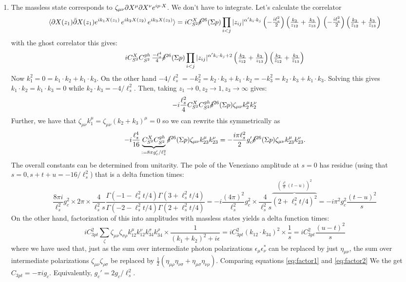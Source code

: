 \documentclass[11pt, class=article, crop=false]{standalone}
\begin{document}
\begin{enumerate}
	
	\item The massless state corresponds to $\zeta_{\mu \nu} \partial X^\mu \partial X^\nu e^{i p \cdot X}$. We don't have to integrate. Let's calculate the correlator
	\[
		\braket{\partial X(z_1) \bar {\partial} X(z_1) e^{i k_1 X(z_1)}\,  e^{i k_2 X(z_2)} \,  e^{i k_3 X(z_3)} } 
		= i C_{S^2}^X \cancel\delta^{26}(\Sigma p) \prod_{i<j} |z_{ij}|^{\alpha' k_i \cdot k_j} \left(-\tfrac{i \ell_s^2}{2}\right) \left(\tfrac{k_2}{z_{12}} + \tfrac{k_3}{z_{13}}\right) \, \left(-\tfrac{i\ell_s^2}{2}\right) \left(\tfrac{k_2}{\bar z_{12}} + \tfrac{k_3}{\bar z_{13}}\right)
	\]
	with the ghost correlator this gives:
	\[
		i C_{S^2}^X C_{S^2}^{gh} \, \tfrac{-\ell_s^4}{4} \cancel\delta^{26}(\Sigma p) \prod_{i<j} |z_{ij}|^{\alpha' k_i \cdot k_j + 2} \left(\tfrac{k_2}{z_{12}} + \tfrac{k_3}{z_{13}}\right)  \left(\tfrac{k_2}{\bar z_{12}} + \tfrac{k_3}{\bar z_{13}}\right)
	\]
	Now $k_1^2 = 0 = k_1 \cdot k_2 + k_1 \cdot k_3$. On the other hand $-4/\ell_s^2 = -k_2^2 = k_2 \cdot k_3 + k_1 \cdot k_2 = -k_3^2 = k_2 \cdot k_3 + k_1 \cdot k_3$. Solving this gives $k_1 \cdot k_2 = k_1 \cdot k_3 = 0$ while $k_2 \cdot k_3 = -4/\ell_s^2$. Then, taking $z_1 \to 0, z_2 \to 1, z_3 \to \infty$ gives:
	\[
		-i \frac{\ell_s^2}{4} C_{S^2}^X C_{S^2}^{gh} \cancel\delta^{26}(\Sigma p) \zeta_{\mu \nu}k_2^\mu k_2^\nu
	\] 
	Further, we have that $\zeta_{\mu \nu} k_1^\mu = \zeta_{\mu \nu} (k_2 + k_3)^\mu = 0$ so we can rewrite this symmetrically as 
	\[
		-i \frac{\ell_s^4}{16} \underbrace{C_{S^2}^X C_{S^2}^{gh}}_{:= 8 \pi g_c'/\ell_s^2} \cancel\delta^{26}(\Sigma p) \zeta_{\mu \nu}  k_{23}^\mu k_{23}^\nu = -\frac{i \pi \ell_s^2}{2} g_c' \cancel\delta^{26}(\Sigma p) \zeta_{\mu \nu} k_{23}^\mu k_{23}^\nu.
	\]
	The overall constants can be determined from unitarity. The pole of the Veneziano amplitude at $s = 0$ has residue (using that $s = 0, s+t+u = -16/\ell_s^2$) that is a delta function times:
	\begin{equation}\label{eq:factor1}
		\frac{8 \pi i}{\ell_s^2} g_c^2 \times 2\pi \times \frac{4}{\ell_s^2 s} \frac{\Gamma(-1-\ell_s^2 t/4) \Gamma(3 + \ell_s^2 t/4)}{\Gamma(-2-\ell_s^2 t/4) \Gamma(2 + \ell_s^2 t/4)} = -i \frac{(4 \pi)^2}{\ell_s^2} g_c^2 \times \frac{4}{\ell_s^2 s} \overbrace{(2 + \ell_s^2 t/4)^2}^{(\frac{\ell_s^2}{8} (t - u))^2} = -i \pi^2 g_c^2 \frac{(t-u)^2}{s} 
	\end{equation}
	On the other hand, factorization of this into amplitudes with massless states yields a delta function times:
	\begin{equation}\label{eq:factor2}
		i C^2_{3pt} \sum_{\zeta} \zeta_{\mu \nu} \zeta_{\sigma \rho} k_{12}^\mu k_{12}^\nu k_{34}^\sigma k_{34}^\rho \times \frac{1}{(k_1 + k_2)^2 + i \epsilon}
		= i C^2_{3pt} (k_{12} \cdot k_{34})^2 \times \frac{1}{s}
		 = i C^2_{3pt} \frac{(u-t)^2}{s}
	\end{equation}
	where we have used that, just as the sum over intermediate photon polarizations $\epsilon_\mu \epsilon^*_\nu$ can be replaced by just $\eta_{\mu \nu}$, the sum over intermediate polarizations $\zeta_{\mu \nu} \zeta_{\rho \sigma}$ be replaced by $\frac12 (\eta_{\mu \rho} \eta_{\nu \sigma} + \eta_{\mu \sigma} \eta_{\nu \rho})$. Comparing equations \eqref{eq:factor1} and \eqref{eq:factor2} We the get $C_{3pt} = -\pi i g_c$. Equivalently, $g_c' = 2 g_c /\ell_s^2$.


\end{enumerate}
\end{document}
